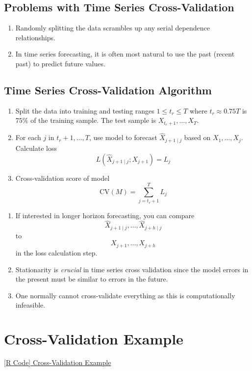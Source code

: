 \subsection*{Problems with Time Series Cross-Validation}
\begin{enumerate}[(1)]
      \item Randomly splitting the data scrambles up any serial dependence relationships.
      \item In time series forecasting, it is often most natural to use
            the past (recent past) to predict future values.
\end{enumerate}
\subsection*{Time Series Cross-Validation Algorithm}
\begin{enumerate}[(1)]
      \item Split the data into training and testing ranges $ 1\le t_r\le T $
            where $ t_r\approx 0.75T $ is $ 75\% $ of the training sample.
            The test sample is $ X_{t_r+1},\ldots,X_T $.
      \item For each $ j $ in $ t_r+1,\ldots,T $, use model to forecast
            $ \hat{X}_{j+1\mid j} $ based on $ X_1,\ldots,X_j $. Calculate loss
            \[ L(\hat{X}_{j+1\mid j};X_{j+1})=L_j \]
      \item Cross-validation score of model
            \[ \text{CV}(M)=\sum_{j=t_r+1}^{T} L_j \]
\end{enumerate}
\begin{Remark}{}{}
      \begin{enumerate}
            \item If interested in longer horizon forecasting, you can compare
                  \[ \hat{X}_{j+1\mid j},\ldots,\hat{X}_{j+h\mid j} \]
                  to
                  \[ X_{j+1},\ldots,X_{j+h} \]
                  in the loss calculation step.
            \item Stationarity is \emph{crucial} in time series cross validation
                  since the model errors in the present must be similar to errors in the future.
            \item One normally cannot cross-validate everything as this is computationally
                  infeasible.
      \end{enumerate}
\end{Remark}
\section{Cross-Validation Example}
\href{https://github.com/Hextical/university-notes/blob/master/year-3/semester-2/STAT%20443/code/6.4%20-%20Cross-Validation%20Example.R}{[R Code] Cross-Validation Example}
